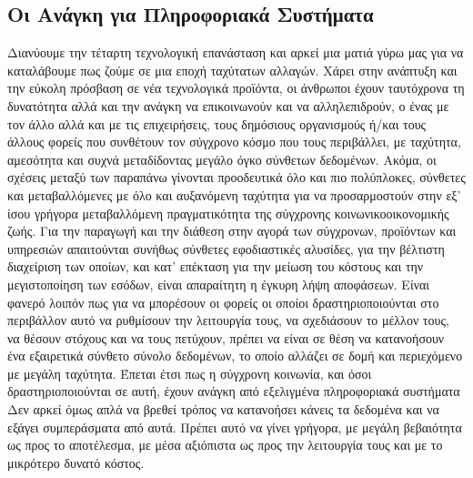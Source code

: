\documentclass{article}
\begin{document}
\subsection{Οι Ανάγκη για Πληροφοριακά Συστήματα}
Διανύουμε την τέταρτη τεχνολογική επανάσταση και αρκεί μια ματιά γύρω μας για να καταλάβουμε πως ζούμε σε μια εποχή ταχύτατων αλλαγών. Χάρει στην ανάπτυξη και την εύκολη πρόσβαση σε νέα τεχνολογικά προϊόντα, οι άνθρωποι έχουν ταυτόχρονα τη δυνατότητα αλλά και την ανάγκη να επικοινωνούν και να αλληλεπιδρούν, ο ένας με τον άλλο αλλά και με τις επιχειρήσεις, τους δημόσιους οργανισμούς ή/και τους άλλους φορείς που συνθέτουν τον σύγχρονο κόσμο που τους περιβάλλει, με ταχύτητα, αμεσότητα και συχνά μεταδίδοντας μεγάλο όγκο σύνθετων δεδομένων. Ακόμα, οι σχέσεις μεταξύ των παραπάνω γίνονται προοδευτικά όλο και πιο πολύπλοκες, σύνθετες και μεταβαλλόμενες με όλο και αυξανόμενη ταχύτητα για να προσαρμοστούν στην εξ’ ίσου γρήγορα μεταβαλλόμενη πραγματικότητα της σύγχρονης κοινωνικοοικονομικής ζωής. Για την παραγωγή και την διάθεση στην αγορά των σύγχρονων, προϊόντων και υπηρεσιών απαιτούνται συνήθως σύνθετες εφοδιαστικές αλυσίδες, για την βέλτιστη διαχείριση των οποίων, και κατ’ επέκταση για την μείωση του κόστους και την μεγιστοποίηση των εσόδων, είναι απαραίτητη η έγκυρη λήψη αποφάσεων. Είναι φανερό λοιπόν πως για να μπορέσουν οι φορείς οι οποίοι δραστηριοποιούνται στο περιβάλλον αυτό να ρυθμίσουν την λειτουργία τους, να σχεδιάσουν το μέλλον τους, να θέσουν στόχους και να τους πετύχουν, πρέπει να  είναι σε θέση να κατανοήσουν ένα εξαιρετικά σύνθετο σύνολο δεδομένων, το οποίο αλλάζει σε δομή και περιεχόμενο με μεγάλη ταχύτητα.
Έπεται έτσι πως η σύγχρονη κοινωνία, και όσοι δραστηριοποιούνται σε αυτή, έχουν ανάγκη από εξελιγμένα πληροφοριακά συστήματα
 Δεν αρκεί όμως απλά  να βρεθεί τρόπος να κατανοήσει κάνεις τα δεδομένα και να εξάγει συμπεράσματα από αυτά. Πρέπει αυτό να γίνει γρήγορα, με μεγάλη βεβαιότητα ως προς το αποτέλεσμα, με μέσα αξιόπιστα ως προς την λειτουργία τους και με το μικρότερο δυνατό κόστος.
\end{document}
